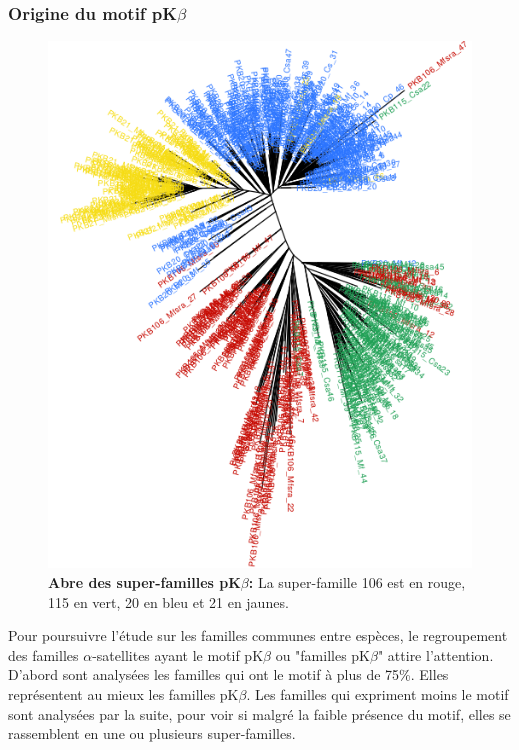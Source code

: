 \documentclass[12pt,a4paper]{article}
\begin{document}
	\subsubsection{Origine du motif pK$\beta$}
		\begin{figure}	
			\centering
				\includegraphics[scale=0.4, angle =90]{img/pkb_tree.png}				
				\caption{\textbf{Abre des super-familles pK$\beta$:} La super-famille 106 est en rouge, 115 en vert, 20 en bleu et 21 en jaunes.
	\label{fig:pkb_tree}} 
\end{figure}
	Pour poursuivre l'étude sur les familles communes entre espèces, le regroupement des familles $\alpha$-satellites ayant  le motif pK$\beta$ ou "familles pK$\beta$" attire l'attention. D'abord sont analysées les familles qui ont le motif à plus de 75\%. Elles représentent au mieux les familles pK$\beta$. Les familles qui expriment moins le motif sont analysées par la suite, pour voir si malgré la faible présence du motif, elles se rassemblent en une ou plusieurs super-familles.
\end{document}
